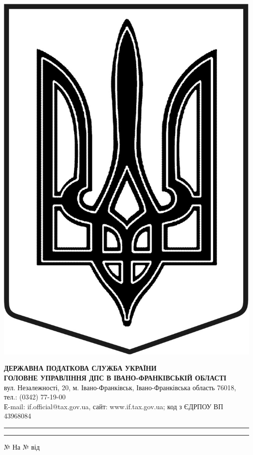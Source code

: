 \begin{center}
	\includegraphics[scale=0.22]{tryzub2.jpg}
\end{center}

\begin{center}
	{\small 	\textbf{ДЕРЖАВНА ПОДАТКОВА СЛУЖБА УКРАЇНИ}}\\
	{\small	\textbf{ГОЛОВНЕ УПРАВЛІННЯ ДПС В ІВАНО-ФРАНКІВСЬКІЙ ОБЛАСТІ}}\\
	
	\vspace{1mm}
	{\scriptsize вул. Незалежності, 20, м. Івано-Франківськ, Івано-Франківська область 76018, тел.: (0342) 77-19-00}\\
	{\scriptsize Е-mail: if.official@tax.gov.ua, сайт: www.if.tax.gov.ua; код з ЄДРПОУ ВП 43968084} 	
		 
	\vspace{1.5mm}
	\hrule height 2pt\smallskip
	\hrule height 0.5pt%
	\smallskip
	\medskip 
	\underline{\hspace{2.5cm}} № \underline{\hspace{2.5cm}}	 \hspace{5ex} \hspace{1ex} 	На № \underline{\hspace{2.5cm}} від \underline{\hspace{3cm}}
	
\end{center}
\nopagebreak[4]
